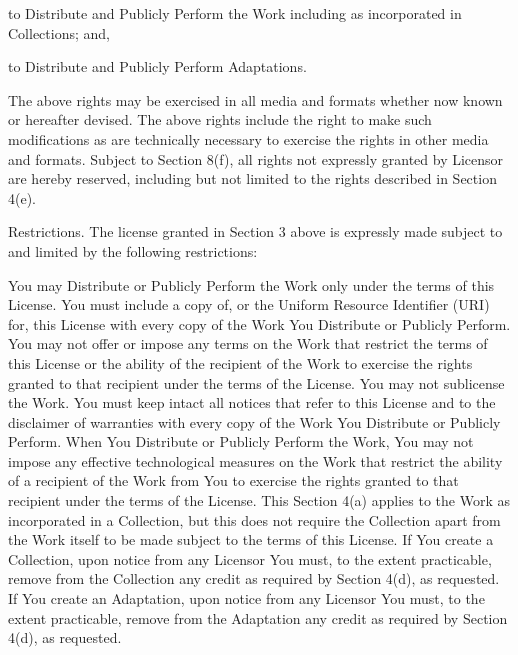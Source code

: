     \item
    to Distribute and Publicly Perform the Work including as incorporated in Collections; and,

    \item
    to Distribute and Publicly Perform Adaptations.
    \stopitemize

The above rights may be exercised in all media and formats whether now known or hereafter devised. The above rights include the right to make such modifications as are technically necessary to exercise the rights in other media and formats. Subject to Section 8(f), all rights not expressly granted by Licensor are hereby reserved, including but not limited to the rights described in Section 4(e).

\item
Restrictions. The license granted in Section 3 above is expressly made subject to and limited by the following restrictions:

    \startitemize[a]
    \item
    You may Distribute or Publicly Perform the Work only under the terms of this License. You must include a copy of, or the Uniform Resource Identifier (URI) for, this License with every copy of the Work You Distribute or Publicly Perform. You may not offer or impose any terms on the Work that restrict the terms of this License or the ability of the recipient of the Work to exercise the rights granted to that recipient under the terms of the License. You may not sublicense the Work. You must keep intact all notices that refer to this License and to the disclaimer of warranties with every copy of the Work You Distribute or Publicly Perform. When You Distribute or Publicly Perform the Work, You may not impose any effective technological measures on the Work that restrict the ability of a recipient of the Work from You to exercise the rights granted to that recipient under the terms of the License. This Section 4(a) applies to the Work as incorporated in a Collection, but this does not require the Collection apart from the Work itself to be made subject to the terms of this License. If You create a Collection, upon notice from any Licensor You must, to the extent practicable, remove from the Collection any credit as required by Section 4(d), as requested. If You create an Adaptation, upon notice from any Licensor You must, to the extent practicable, remove from the Adaptation any credit as required by Section 4(d), as requested.

